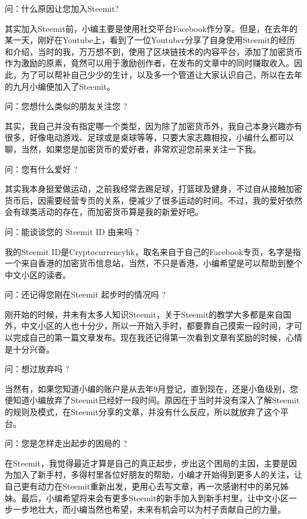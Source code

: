 \documentclass[]{ctexbook}
\begin{document}
问：什么原因让您加入Steemit?

其实加入Steemit前，小编主要是使用社交平台Facebook作分享。但是，在去年的某一天，刚好在Youtube上，看到了一位Youtuber分享了自身使用Steemit的经历和介绍，当时的我，万万想不到，使用了区块链技术的内容平台，添加了加密货币作为激励的原素，竟然可以用于激励创作者，在发布的文章中的同时赚取收入。因此，为了可以帮补自己少少的生计，以及多一个管道让大家认识自己，所以在去年的九月小编便加入了Steemit。

问：您想什么类似的朋友关注您 ?

其实，我自己并没有指定哪一个类型，因为除了加密货币外，我自己本身兴趣亦有很多，好像电动游戏、足球或是桌球等等，只要大家志趣相投，小编什么都可以聊，当然，如果您是加密货币的爱好者，非常欢迎您前来关注一下我。

问：您有什么爱好 ?

其实我本身挺爱做运动，之前我经常去踢足球，打篮球及健身，不过自从接触加密货币后，因需要经营专页的关系，便减少了很多运动的时间。不过，我的爱好依然会有球类活动的存在，而加密货币算是我的新爱好吧。

问：能谈谈您的 Steemit ID 由来吗 ?

我的Steemit ID是Cryptocurrencyhk，取名来自于自己的Facebook专页，名字是指一个来自香港的加密货币信息站，当然，不只是香港，小编希望是可以帮助到整个中文小区的读者。

问：还记得您刚在Steemit 起步时的情况吗 ?

刚开始的时候，并未有太多人知识Steemit，关于Steemit的教学大多都是来自国外，中文小区的人也十分少，所以一开始入手时，都要靠自己摸索一段时间，才可以完成自己的第一篇文章发布。现在我还记得第一次看到文章有奖励的时候，心情是十分兴奋。

问：想过放弃吗 ?

当然有，如果您知道小编的账户是从去年9月登记，直到现在，还是小鱼级别，您便知道小编放弃了Steemit已经好一段时间。原因在于当时并没有深入了解Steemit的规则及模式，在Steemit分享的文章，并没有什么反应，所以就放弃了这个平台。

问：您是怎样走出起步的困局的 ?

在Steemit，我觉得最近才算是自己的真正起步，步出这个困局的主因，主要是因为加入了新手村，多得村里各位好朋友的帮助，小编才开始得到更多人的关注，让自己更有动力在Steemit重新出发，更用心去写文章，再一次感谢村中的弟兄姊妹。最后，小编希望将来会有更多Steemit的新手加入到新手村里，让中文小区一步一步地壮大，而小编当然也希望，未来有机会可以为村子贡献自己的力量。
\end{document}

